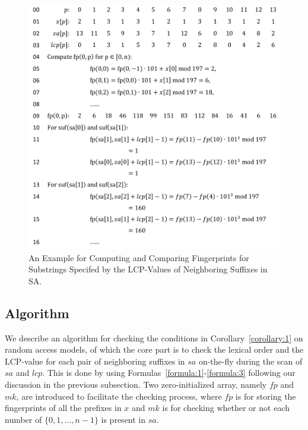 \documentclass[10pt,journal,compsoc]{IEEEtran}
\begin{document}
\begin{figure}
	\centering
	
	\includegraphics[width = 0.9\columnwidth]{example}
	\caption{An Example for Computing and Comparing Fingerprints for Substrings Specifed by the LCP-Values of Neighboring Suffixes in SA. \label{fig:example}}	
\end{figure}

\subsection{Algorithm} \label{sec:method1:algorithm}

We describe an algorithm for checking the conditions in Corollary~\ref{corollary:1} on random access models, of which the core part is to check the lexical order and the LCP-value for each pair of neighboring suffixes in $sa$ on-the-fly during the scan of $sa$ and $lcp$. This is done by using Formulas~\ref{formula:1}-\ref{formula:3} following our discussion in the previous subsection. Two zero-initialized array, namely $fp$ and $mk$, are introduced to facilitate the checking process, where $fp$ is for storing the fingerprints of all the prefixes in $x$ and $mk$ is for checking whether or not each number of $\{0, 1, ..., n - 1\}$ is present in $sa$.
\end{document}
